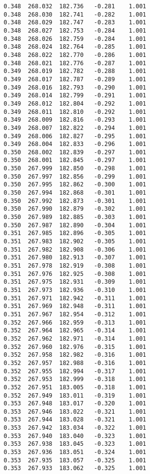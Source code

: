 \begin{verbatim}
   0.348  268.032  182.736   -0.281    1.001
   0.348  268.030  182.741   -0.282    1.001
   0.348  268.029  182.747   -0.283    1.001
   0.348  268.027  182.753   -0.284    1.001
   0.348  268.026  182.759   -0.284    1.001
   0.348  268.024  182.764   -0.285    1.001
   0.348  268.022  182.770   -0.286    1.001
   0.348  268.021  182.776   -0.287    1.001
   0.349  268.019  182.782   -0.288    1.001
   0.349  268.017  182.787   -0.289    1.001
   0.349  268.016  182.793   -0.290    1.001
   0.349  268.014  182.799   -0.291    1.001
   0.349  268.012  182.804   -0.292    1.001
   0.349  268.011  182.810   -0.292    1.001
   0.349  268.009  182.816   -0.293    1.001
   0.349  268.007  182.822   -0.294    1.001
   0.349  268.006  182.827   -0.295    1.001
   0.349  268.004  182.833   -0.296    1.001
   0.350  268.002  182.839   -0.297    1.001
   0.350  268.001  182.845   -0.297    1.001
   0.350  267.999  182.850   -0.298    1.001
   0.350  267.997  182.856   -0.299    1.001
   0.350  267.995  182.862   -0.300    1.001
   0.350  267.994  182.868   -0.301    1.001
   0.350  267.992  182.873   -0.301    1.001
   0.350  267.990  182.879   -0.302    1.001
   0.350  267.989  182.885   -0.303    1.001
   0.350  267.987  182.890   -0.304    1.001
   0.351  267.985  182.896   -0.305    1.001
   0.351  267.983  182.902   -0.305    1.001
   0.351  267.982  182.908   -0.306    1.001
   0.351  267.980  182.913   -0.307    1.001
   0.351  267.978  182.919   -0.308    1.001
   0.351  267.976  182.925   -0.308    1.001
   0.351  267.975  182.931   -0.309    1.001
   0.351  267.973  182.936   -0.310    1.001
   0.351  267.971  182.942   -0.311    1.001
   0.351  267.969  182.948   -0.311    1.001
   0.351  267.967  182.954   -0.312    1.001
   0.352  267.966  182.959   -0.313    1.001
   0.352  267.964  182.965   -0.314    1.001
   0.352  267.962  182.971   -0.314    1.001
   0.352  267.960  182.976   -0.315    1.001
   0.352  267.958  182.982   -0.316    1.001
   0.352  267.957  182.988   -0.316    1.001
   0.352  267.955  182.994   -0.317    1.001
   0.352  267.953  182.999   -0.318    1.001
   0.352  267.951  183.005   -0.318    1.001
   0.352  267.949  183.011   -0.319    1.001
   0.353  267.948  183.017   -0.320    1.001
   0.353  267.946  183.022   -0.321    1.001
   0.353  267.944  183.028   -0.321    1.001
   0.353  267.942  183.034   -0.322    1.001
   0.353  267.940  183.040   -0.323    1.001
   0.353  267.938  183.045   -0.323    1.001
   0.353  267.936  183.051   -0.324    1.001
   0.353  267.935  183.057   -0.325    1.001
   0.353  267.933  183.062   -0.325    1.001

\end{verbatim}
